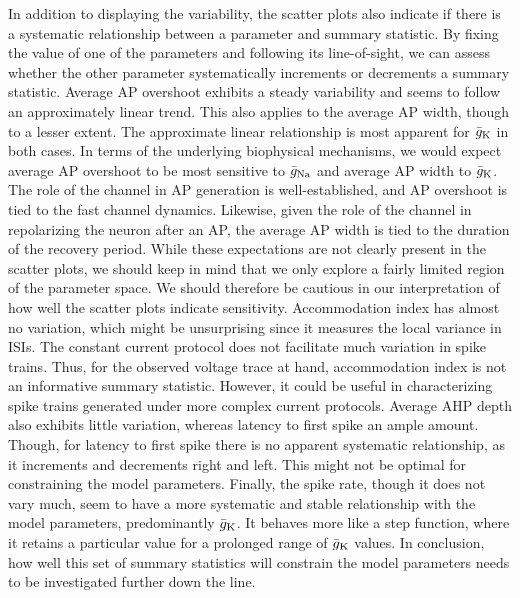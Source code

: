 In addition to displaying the variability, the scatter plots also indicate if there is a systematic relationship between a parameter and summary statistic. By fixing the value of one of the parameters and following its line-of-sight, we can assess whether the other parameter systematically increments or decrements a summary statistic. Average AP overshoot exhibits a steady variability and seems to follow an approximately linear trend. This also applies to the average AP width, though to a lesser extent. The approximate linear relationship is most apparent for $\bar{g}_{\mathrm{K}}$ in both cases. In terms of the underlying biophysical mechanisms, we would expect average AP overshoot to be most sensitive to $\bar{g}_{\mathrm{Na}}$ and average AP width to $\bar{g}_{\mathrm{K}}$. The role of the \Na channel in AP generation is well-established, and AP overshoot is tied to the fast \Na channel dynamics. Likewise, given the role of the \K channel in repolarizing the neuron after an AP, the average AP width is tied to the duration of the recovery period. While these expectations are not clearly present in the scatter plots, we should keep in mind that we only explore a fairly limited region of the parameter space. We should therefore be cautious in our interpretation of how well the scatter plots indicate sensitivity. Accommodation index has almost no variation, which might be unsurprising since it measures the local variance in ISIs. The constant current protocol does not facilitate much variation in spike trains. Thus, for the observed voltage trace at hand, accommodation index is not an informative summary statistic. However, it could be useful in characterizing spike trains generated under more complex current protocols. Average AHP depth also exhibits little variation, whereas latency to first spike an ample amount. Though, for latency to first spike there is no apparent systematic relationship, as it increments and decrements right and left. This might not be optimal for constraining the model parameters. Finally, the spike rate, though it does not vary much, seem to have a more systematic and stable relationship with the model parameters, predominantly $\bar{g}_{\mathrm{K}}$. It behaves more like a step function, where it retains a particular value for a prolonged range of $\bar{g}_{\mathrm{K}}$ values. In conclusion, how well this set of summary statistics will constrain the model parameters needs to be investigated further down the line.  

